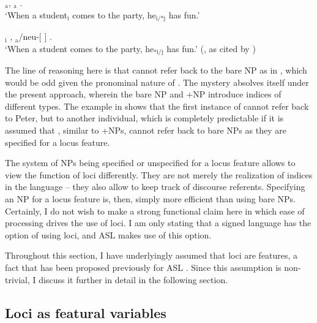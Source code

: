 \documentclass[output=paper,
modfonts
]{langscibook}
\begin{document}
\begin{exe} 
	\ex \label{ex:irani:67}
	\begin{xlist} 
		\ex \label{ex:irani:67a}  $_\text{a}$, $_\text{a}$ .\\
		`When a student$_\text{i}$ comes to the party, he$_\text{i/*j}$ has fun.’  
		
		\ex  {}$_\text{i}$ , $_\text{a}$/neu-[ ] .\\
		`When a student comes to the party, he$_\text{*i/j}$ has fun.’ (\citealt[18]{Schlenker2010}, as cited by \citealt[242]{KoulidobrovaLilloMartin2016})
	\end{xlist}     
\end{exe} 

The line of reasoning here is that  cannot refer back to the bare NP as in , which would be odd given the pronominal nature of . The mystery absolves itself under the present approach, wherein the bare NP and +NP introduce indices of different types. The example in  shows that the first instance of  cannot refer back to Peter, but to another individual, which is completely predictable if it is assumed that , similar to +NPs, cannot refer back to bare NPs as they are specified for a locus feature. 

The system of NPs being specified or unspecified for a locus feature allows to view the function of loci differently. They are not merely the realization of indices in the language -- they also allow to keep track of discourse referents. Specifying an NP for a locus feature is, then, simply more efficient than using bare NPs. Certainly, I do not wish to make a strong functional claim here in which ease of processing drives the use of loci. I am only stating that a signed language has the option of using loci, and ASL makes use of this option.  

Throughout this section, I have underlyingly assumed that loci are features, a fact that has been proposed previously for ASL \citep{Kuhn2015, Schlenker2014}. Since this assumption is non-trivial, I discuss it further in detail in the following section. 

\subsection{Loci as featural variables}\label{sec:irani:4.3}
\end{document}
